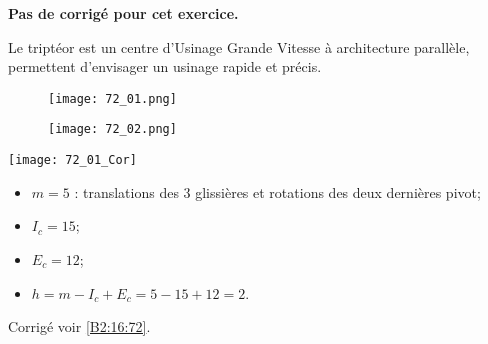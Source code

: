 \normaltrue \difficilefalse \tdifficilefalse
\correctiontrue

\setcounter{question}{0}


\ifcorrection
\else
\textbf{Pas de corrigé pour cet exercice.}
\fi

\ifprof
\else
Le triptéor est un centre d'Usinage Grande Vitesse à architecture parallèle, permettent d'envisager un usinage rapide et précis.


\begin{figure}[H]
\centering
\texttt{[image: 72\_01.png]}
\end{figure} 

\begin{figure}[H]
\centering
\texttt{[image: 72\_02.png]}
\end{figure} 
\fi

\ifprof
\begin{center}
\texttt{[image: 72\_01\_Cor]}
\end{center}
\else
\fi

\ifprof
\begin{itemize}
\item $m=5$ : translations des 3 glissières et rotations des deux dernières pivot;
\item $I_c=15$;
\item $E_c = 12$;
\item $h=m-I_c+E_c = 5 -15 + 12 = 2$.
\end{itemize}
\else
\fi
 

\ifprof
\else

\noindent\footnotesize
\normalsize

\begin{flushright}
\footnotesize{Corrigé  voir \ref{B2:16:72}.}
\end{flushright}%
\fi